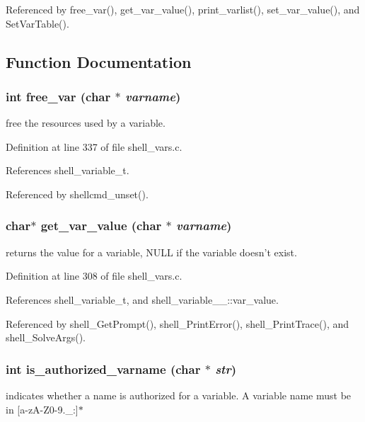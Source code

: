 Referenced by free\_\-var(), get\_\-var\_\-value(), print\_\-varlist(), set\_\-var\_\-value(), and Set\-Var\-Table().

\subsection{Function Documentation}
\subsubsection{\setlength{\rightskip}{0pt plus 5cm}int free\_\-var (char $\ast$ {\em varname})}\label{shell__vars_8c_a17}


free the resources used by a variable. 

Definition at line 337 of file shell\_\-vars.c.

References shell\_\-variable\_\-t.

Referenced by shellcmd\_\-unset().
\subsubsection{\setlength{\rightskip}{0pt plus 5cm}char$\ast$ get\_\-var\_\-value (char $\ast$ {\em varname})}\label{shell__vars_8c_a15}


returns the value for a variable, NULL if the variable doesn't exist. 

Definition at line 308 of file shell\_\-vars.c.

References shell\_\-variable\_\-t, and shell\_\-variable\_\-\_\-::var\_\-value.

Referenced by shell\_\-Get\-Prompt(), shell\_\-Print\-Error(), shell\_\-Print\-Trace(), and shell\_\-Solve\-Args().
\subsubsection{\setlength{\rightskip}{0pt plus 5cm}int is\_\-authorized\_\-varname (char $\ast$ {\em str})}\label{shell__vars_8c_a14}


indicates whether a name is authorized for a variable. A variable name must be in [a-z\-A-Z0-9.\_\-:]$\ast$ 

